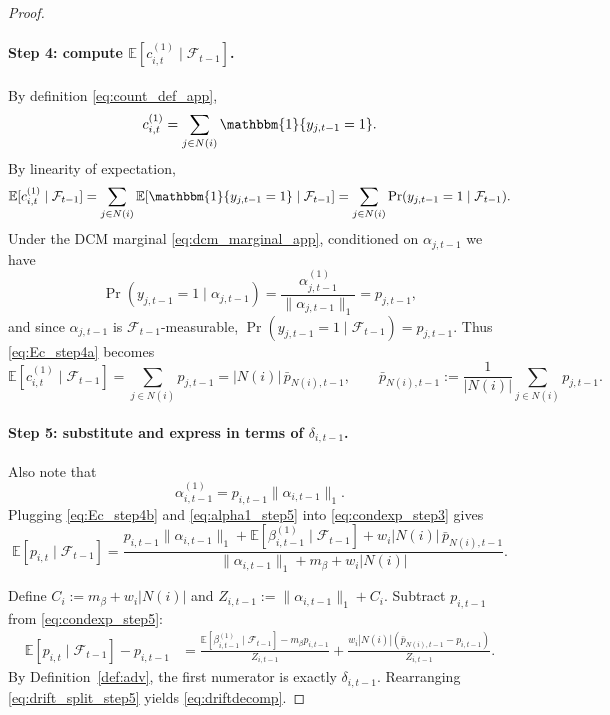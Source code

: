 \begin{proof}
\paragraph{Step 4: compute $\mathbb{E}[c^{(1)}_{i,t}\mid\mathcal{F}_{t-1}]$.}
By definition \eqref{eq:count_def_app},
\[
c^{(1)}_{i,t}=\sum_{j\in N(i)}\mathbbm{1}\{y_{j,t-1}=1\}.
\]
By linearity of expectation,
\begin{equation}
\mathbb{E}[c^{(1)}_{i,t}\mid\mathcal{F}_{t-1}]
=\sum_{j\in N(i)}\mathbb{E}\!\left[\mathbbm{1}\{y_{j,t-1}=1\}\mid\mathcal{F}_{t-1}\right]
=\sum_{j\in N(i)}\Pr(y_{j,t-1}=1\mid\mathcal{F}_{t-1}).
\label{eq:Ec_step4a}
\end{equation}
Under the DCM marginal \eqref{eq:dcm_marginal_app}, conditioned on \(\alpha_{j,t-1}\) we have
\[
\Pr(y_{j,t-1}=1\mid\alpha_{j,t-1})=\frac{\alpha^{(1)}_{j,t-1}}{\|\alpha_{j,t-1}\|_1}=p_{j,t-1},
\]
and since \(\alpha_{j,t-1}\) is \(\mathcal{F}_{t-1}\)-measurable, \(\Pr(y_{j,t-1}=1\mid\mathcal{F}_{t-1})=p_{j,t-1}\).
Thus \eqref{eq:Ec_step4a} becomes
\begin{equation}
\mathbb{E}[c^{(1)}_{i,t}\mid\mathcal{F}_{t-1}]
=\sum_{j\in N(i)} p_{j,t-1}
=|N(i)|\,\bar p_{N(i),t-1},
\qquad
\bar p_{N(i),t-1}:=\frac{1}{|N(i)|}\sum_{j\in N(i)}p_{j,t-1}.
\label{eq:Ec_step4b}
\end{equation}

\paragraph{Step 5: substitute and express in terms of $\delta_{i,t-1}$.}
Also note that
\begin{equation}
\alpha^{(1)}_{i,t-1}=p_{i,t-1}\|\alpha_{i,t-1}\|_1.
\label{eq:alpha1_step5}
\end{equation}
Plugging \eqref{eq:Ec_step4b} and \eqref{eq:alpha1_step5} into \eqref{eq:condexp_step3} gives
\begin{equation}
\mathbb{E}[p_{i,t}\mid\mathcal{F}_{t-1}]
=
\frac{p_{i,t-1}\|\alpha_{i,t-1}\|_1
+\mathbb{E}[\beta^{(1)}_{i,t-1}\mid\mathcal{F}_{t-1}]
+w_i|N(i)|\,\bar p_{N(i),t-1}}
{\|\alpha_{i,t-1}\|_1+m_\beta+w_i|N(i)|}.
\label{eq:condexp_step5}
\end{equation}

Define \(C_i:=m_\beta+w_i|N(i)|\) and \(Z_{i,t-1}:=\|\alpha_{i,t-1}\|_1+C_i\).
Subtract \(p_{i,t-1}\) from \eqref{eq:condexp_step5}:
\begin{align}
\mathbb{E}[p_{i,t}\mid\mathcal{F}_{t-1}] - p_{i,t-1}
&=
\frac{\mathbb{E}[\beta^{(1)}_{i,t-1}\mid\mathcal{F}_{t-1}] - m_\beta p_{i,t-1}}
{Z_{i,t-1}}
+\frac{w_i|N(i)|(\bar p_{N(i),t-1}-p_{i,t-1})}{Z_{i,t-1}}.
\label{eq:drift_split_step5}
\end{align}
By Definition~\ref{def:adv}, the first numerator is exactly \(\delta_{i,t-1}\).
Rearranging \eqref{eq:drift_split_step5} yields \eqref{eq:driftdecomp}.
\end{proof}

